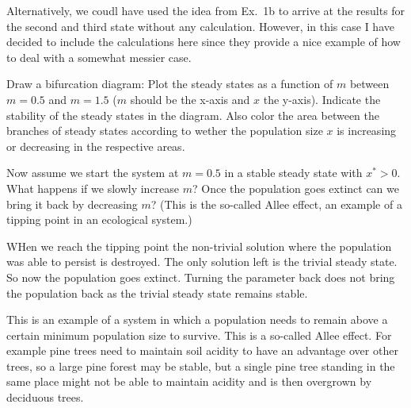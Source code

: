 Alternatively, we coudl have used the idea from Ex.~1b to arrive at the results for the second and third state without any calculation. However, in this case I have decided to include the calculations here since they provide a nice example of how to deal with a somewhat messier case.  

\subquestion
Draw a bifurcation diagram: Plot the steady states as a function of $m$ between $m=0.5$ and $m=1.5$ ($m$ should be the x-axis and $x$ the y-axis). Indicate the stability of the steady states in the diagram. Also color the area between the branches of steady states according to wether the population size $x$ is increasing or decreasing in the respective areas.   

\subquestion
Now assume we start the system at $m=0.5$ in a stable steady state with $x^*>0$. What happens if we slowly increase $m$? Once the population goes extinct can we bring it back by decreasing $m$? (This is the so-called Allee effect, an example of a tipping point in an ecological system.)

\solution
WHen we reach the tipping point the non-trivial solution where the population was able to persist is destroyed. The only solution left is the trivial steady state. So now the population goes extinct. Turning the parameter back does not bring the population back as the trivial steady state remains stable. 

This is an example of a system in which a population needs to remain above a certain minimum population size to survive. This is a so-called Allee effect. For example pine trees need to maintain soil acidity to have an advantage over other trees, so a large pine forest may be stable, but a single pine tree standing in the same place might not be able to maintain acidity and is then overgrown by deciduous trees.




